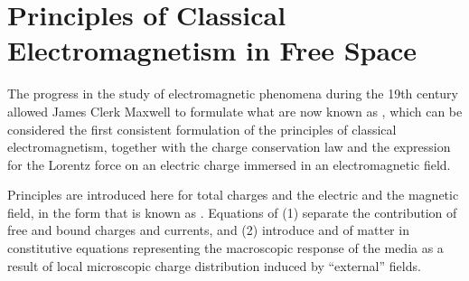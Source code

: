 \documentclass[letterpaper,10pt,english]{jupyterBook}
\begin{document}
\section{Principles of Classical Electromagnetism in Free Space}
\label{\detokenize{ch/principles-vacuum:principles-of-classical-electromagnetism-in-free-space}}\label{\detokenize{ch/principles-vacuum:classical-electromagnetism-principles-free-space}}\label{\detokenize{ch/principles-vacuum::doc}}
\sphinxAtStartPar
The progress in the study of electromagnetic phenomena during the 19th century allowed James Clerk Maxwell to formulate what are now known as , which can be considered the first consistent formulation of the principles of classical electromagnetism, together with the charge conservation law and the expression for the Lorentz force on an electric charge immersed in an electromagnetic field.

\sphinxAtStartPar
Principles are introduced here for total charges and the electric and the magnetic field, in the form that is known as . Equations of  (1) separate the contribution of free and bound charges and currents, and (2) introduce  and  of matter in constitutive equations representing the macroscopic response of the media as a result of local microscopic charge distribution induced by “external” fields.
\end{document}
